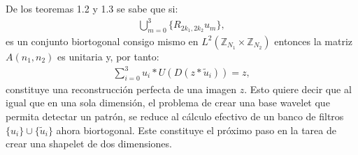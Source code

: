 \par De los teoremas 1.2 y 1.3 se sabe que si:
\begin{eqnarray}
\bigcup_{m=0}^{3}\{R_{2k_1,2k_2}u_m\},\nonumber
\end{eqnarray}
es un conjunto biortogonal consigo mismo en $L^2(\mathbb{Z}_{N_1}\times\mathbb{Z}_{N_2})$ entonces la matriz $A(n_1,n_2)$ es unitaria y, por tanto:
\begin{eqnarray}
\sum_{i=0}^3 u_i\ast U(D(z\ast\tilde{u}_i))=z,\nonumber
\end{eqnarray}
constituye una reconstrucci\'on perfecta de una imagen $z$. Esto quiere decir que al igual que en una sola dimensi\'on, el problema de crear una base wavelet que permita detectar un patr\'on, se reduce al c\'alculo efectivo de un banco de filtros $\{u_i\}\cup\{\tilde{u}_i\}$ ahora biortogonal. Este constituye el pr\'oximo paso en la tarea de crear una shapelet de dos dimensiones.\\